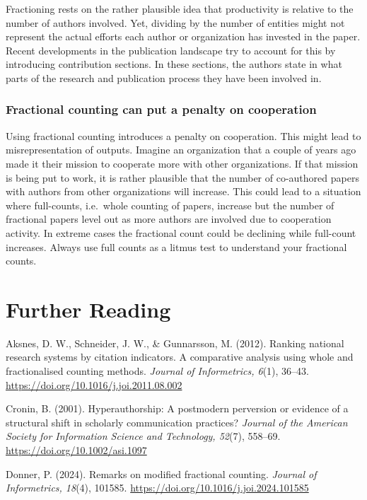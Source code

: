 \documentclass[
  letterpaper,
]{scrreprt}
\begin{document}
Fractioning rests on the rather plausible idea that productivity is
relative to the number of authors involved. Yet, dividing by the number
of entities might not represent the actual efforts each author or
organization has invested in the paper. Recent developments in the
publication landscape try to account for this by introducing
contribution sections. In these sections, the authors state in what
parts of the research and publication process they have been involved
in.

\subsubsection{Fractional counting can put a penalty on
cooperation}\label{fractional-counting-can-put-a-penalty-on-cooperation}

Using fractional counting introduces a penalty on cooperation. This
might lead to misrepresentation of outputs. Imagine an organization that
a couple of years ago made it their mission to cooperate more with other
organizations. If that mission is being put to work, it is rather
plausible that the number of co-authored papers with authors from other
organizations will increase. This could lead to a situation where
full-counts, i.e.~whole counting of papers, increase but the number of
fractional papers level out as more authors are involved due to
cooperation activity. In extreme cases the fractional count could be
declining while full-count increases. Always use full counts as a litmus
test to understand your fractional counts.

\section{Further Reading}\label{further-reading-7}

Aksnes, D. W., Schneider, J. W., \& Gunnarsson, M. (2012). Ranking
national research systems by citation indicators. A comparative analysis
using whole and fractionalised counting methods. \emph{Journal of
Informetrics, 6}(1), 36--43.
\url{https://doi.org/10.1016/j.joi.2011.08.002}

Cronin, B. (2001). Hyperauthorship: A postmodern perversion or evidence
of a structural shift in scholarly communication practices?
\emph{Journal of the American Society for Information Science and
Technology, 52}(7), 558--69. \url{https://doi.org/10.1002/asi.1097}

Donner, P. (2024). Remarks on modified fractional counting.
\emph{Journal of Informetrics, 18}(4), 101585.
\url{https://doi.org/10.1016/j.joi.2024.101585}
\end{document}

